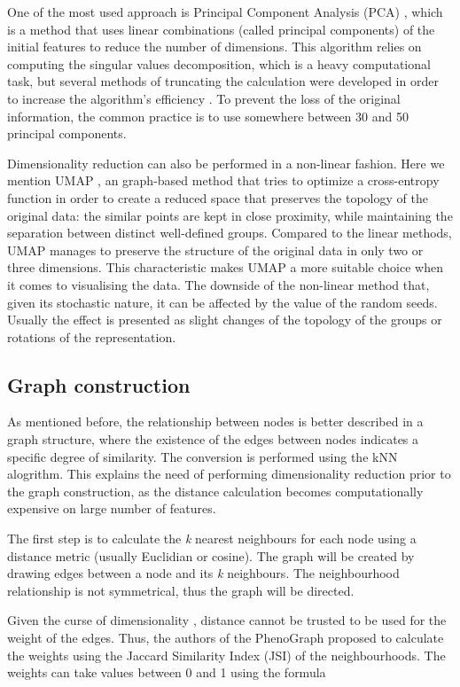     One of the most used approach is Principal Component Analysis (PCA) \cite{WOLD198737}, which is a method that uses linear combinations (called principal components) of the initial features to reduce the number of dimensions. This algorithm relies on computing the singular values decomposition, which is a heavy computational task, but several methods of truncating the calculation were developed in order to increase the algorithm's efficiency \cite{Baglama2016IRLBAFP}. To prevent the loss of the original information, the common practice is to use somewhere between 30 and 50 principal components.

    Dimensionality reduction can also be performed in a non-linear fashion. Here we mention UMAP \cite{mcinnes2018uniform}, an graph-based method that tries to optimize a cross-entropy function in order to create a reduced space that preserves the topology of the original data: the similar points are kept in close proximity, while maintaining the separation between distinct well-defined groups. Compared to the linear methods, UMAP manages to preserve the structure of the original data in only two or three dimensions. This characteristic makes UMAP a more suitable choice when it comes to visualising the data. The downside of the non-linear method that, given its stochastic nature, it can be affected by the value of the random seeds. Usually the effect is presented as slight changes of the topology of the groups or rotations of the representation.

    \subsection{Graph construction}
    As mentioned before, the relationship between nodes is better described in a graph structure, where the existence of the edges between nodes indicates a specific degree of similarity. The conversion is performed using the kNN alogrithm. This explains the need of performing dimensionality reduction prior to the graph construction, as the distance calculation becomes computationally expensive on large number of features.
    
    The first step is to calculate the \textit{k} nearest neighbours for each node using a distance metric (usually Euclidian or cosine). The graph will be created by drawing edges between a node and its \textit{k} neighbours. The neighbourhood relationship is not symmetrical, thus the graph will be directed. 
    
    Given the curse of dimensionality \cite{Altman2018}, distance cannot be trusted to be used for the weight of the edges. Thus, the authors of the PhenoGraph proposed to calculate the weights using the Jaccard Similarity Index (JSI) of the neighbourhoods. The weights can take values between 0 and 1 using the formula 
    
